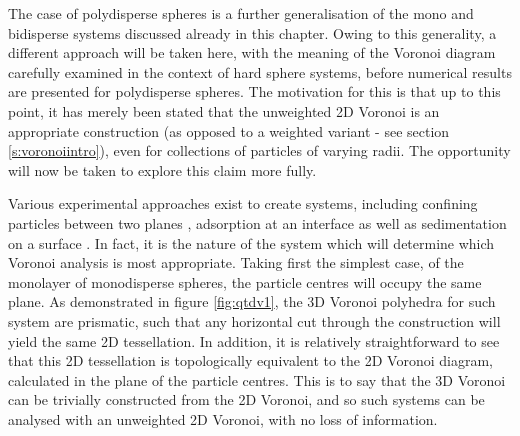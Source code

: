 The case of \qtd{} polydisperse spheres is a further generalisation of the mono and bidisperse systems discussed already in this chapter.
Owing to this generality, a different approach will be taken here, with the meaning of the Voronoi diagram carefully examined in the context of \qtd{} hard sphere systems, before numerical results are presented for polydisperse spheres.
The motivation for this is that up to this point, it has merely been stated that the unweighted 2D Voronoi is an appropriate construction (as opposed to a weighted variant - see section \ref{s:voronoiintro}), even for collections of particles of varying radii.
The opportunity will now be taken to explore this claim more fully.

Various experimental approaches exist to create \qtd{} systems, including confining particles between two planes \cite{Marcus1997,Weikai2014}, adsorption at an interface \cite{Peng2009,Vogel2014} as well as sedimentation on a surface \cite{Tamborini2015,Thorneywork2018}.
In fact, it is the nature of the system which will determine which Voronoi analysis is most appropriate.
Taking first the simplest \qtd{} case, of the monolayer of monodisperse spheres, the particle centres will occupy the same plane.
As demonstrated in figure \ref{fig:qtdv1}, the 3D Voronoi polyhedra for such system are prismatic, such that any horizontal cut through the construction will yield the same 2D tessellation. 
In addition, it is relatively straightforward to see that this 2D tessellation is topologically equivalent to the 2D Voronoi diagram, calculated in the plane of the particle centres.
This is to say that the 3D Voronoi can be trivially constructed from the 2D Voronoi, and so such systems can be analysed with an unweighted 2D Voronoi, with no loss of information.

